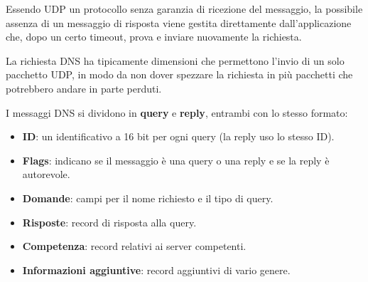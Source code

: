 Essendo UDP un protocollo senza garanzia di ricezione del messaggio, la possibile assenza di un
messaggio di risposta viene gestita direttamente dall'applicazione che, dopo un certo timeout, 
prova e inviare nuovamente la richiesta.

La richiesta DNS ha tipicamente dimensioni che permettono l'invio di un solo pacchetto UDP, in
modo da non dover spezzare la richiesta in più pacchetti che potrebbero andare in parte perduti.

I messaggi DNS si dividono in \textbf{query} e \textbf{reply}, entrambi con lo stesso formato:
\begin{itemize}
	\item \textbf{ID}: un identificativo a 16 bit per ogni query (la reply uso lo stesso ID).
	\item \textbf{Flags}: indicano se il messaggio è una query o una reply e se la reply è
		autorevole.
	\item \textbf{Domande}: campi per il nome richiesto e il tipo di query.
	\item \textbf{Risposte}: record di risposta alla query.
	\item \textbf{Competenza}: record relativi ai server competenti.
	\item \textbf{Informazioni aggiuntive}: record aggiuntivi di vario genere.
\end{itemize}

